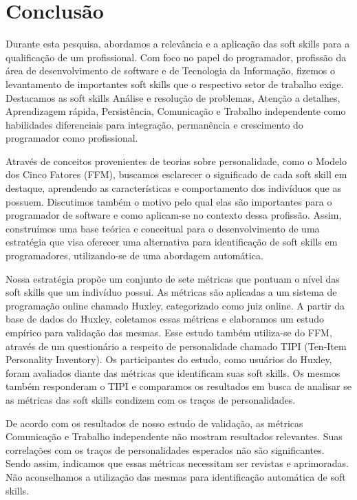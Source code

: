 

\chapter{Conclusão}

\label{chap:conclusion}

Durante esta pesquisa, abordamos a relevância e a aplicação das soft skills para a qualificação de um profissional. Com foco no papel do programador, profissão da área de desenvolvimento de software e de Tecnologia da Informação, fizemos o levantamento de importantes soft skills que o respectivo setor de trabalho exige. Destacamos as soft skills Análise e resolução de problemas, Atenção a detalhes, Aprendizagem rápida, Persistência, Comunicação e Trabalho independente como habilidades diferenciais para integração, permanência e crescimento do programador como profissional.

Através de conceitos provenientes de teorias sobre personalidade, como o Modelo dos Cinco Fatores (FFM), buscamos esclarecer o significado de cada soft skill em destaque, aprendendo as características e comportamento dos indivíduos que as possuem. Discutimos também o motivo pelo qual elas são importantes para o programador de software e como aplicam-se no contexto dessa profissão. Assim, construímos uma base teórica e conceitual para o desenvolvimento de uma estratégia que visa oferecer uma alternativa para identificação de soft skills em programadores, utilizando-se de uma abordagem automática.

Nossa estratégia propõe um conjunto de sete métricas que pontuam o nível das soft skills que um indivíduo possui. As métricas são aplicadas a um sistema de programação online chamado Huxley, categorizado como juiz online. A partir da base de dados do Huxley, coletamos essas métricas e elaboramos um estudo empírico para validação das mesmas. Esse estudo também utiliza-se do FFM, através de um questionário a respeito de personalidade chamado TIPI (Ten-Item Personality Inventory). Os participantes do estudo, como usuários do Huxley, foram avaliados diante das métricas que identificam suas soft skills. Os mesmos também responderam o TIPI e comparamos os resultados em busca de analisar se as métricas das soft skills condizem com os traços de personalidades.

De acordo com os resultados de nosso estudo de validação, as métricas Comunicação e Trabalho independente não mostram resultados relevantes. Suas correlações com os traços de personalidades esperados não são significantes. Sendo assim, indicamos que essas métricas necessitam ser revistas e aprimoradas. Não aconselhamos a utilização das mesmas para identificação automática de soft skills.

